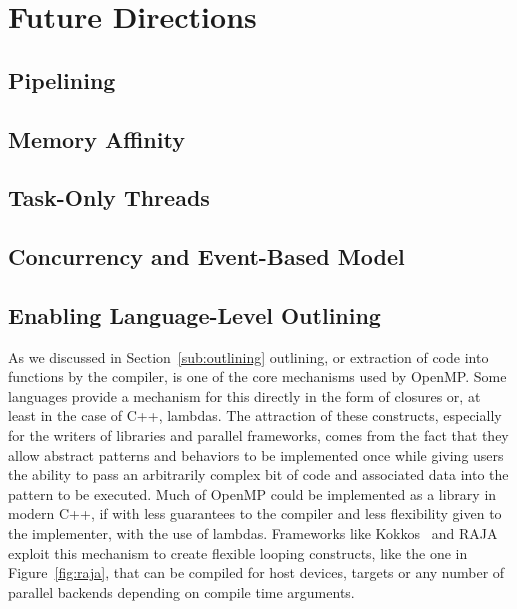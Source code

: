 \section{Future Directions}
\label{sec:future_directions}

\subsection{Pipelining}
\label{sub:pipelining}

\subsection{Memory Affinity}
\label{sub:memory_affinity}

\subsection{Task-Only Threads}
\label{sub:task_only_threads}

\subsection{Concurrency and Event-Based Model}
\label{sub:concurrency_and_event_based_model}

\subsection{Enabling Language-Level Outlining}
\label{sub:enabling_language_level_outlining}

As we discussed in Section~\ref{sub:outlining} outlining, or extraction of code
into functions by the compiler, is one of the core mechanisms used by OpenMP.
Some languages provide a mechanism for this directly in the form of closures or,
at least in the case of C++, lambdas.  The attraction of these constructs,
especially for the writers of libraries and parallel frameworks, comes from the
fact that they allow abstract patterns and behaviors to be implemented once
while giving users the ability to pass an arbitrarily complex bit of code and
associated data into the pattern to be executed.  Much of OpenMP could be
implemented as a library in modern C++, if with less guarantees to the compiler
and less flexibility given to the implementer, with the use of lambdas.
Frameworks like Kokkos~\cite{kokkos} and RAJA~\cite{raja} exploit this mechanism
to create flexible looping constructs, like the one in Figure~\ref{fig:raja},
that can be compiled for host devices, targets or any number of parallel
backends depending on compile time arguments.

